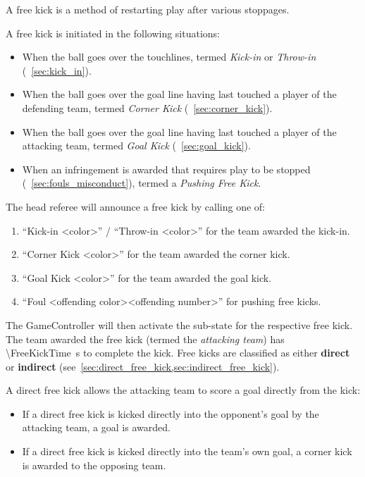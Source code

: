 A free kick is a method of restarting play after various stoppages.

A free kick is initiated in the following situations:
\begin{itemize}
  \item When the ball goes over the touchlines, termed \emph{Kick-in} or \emph{Throw-in} (\cf~\cref{sec:kick_in}).
  \item When the ball goes over the goal line having last touched a player of the defending team, termed \emph{Corner Kick} (\cf~\cref{sec:corner_kick}).
  \item When the ball goes over the goal line having last touched a player of the attacking team, termed \emph{Goal Kick} (\cf~\cref{sec:goal_kick}).
  \item When an infringement is awarded that requires play to be stopped (\cf~\cref{sec:fouls_misconduct}), termed a \emph{Pushing Free Kick}.
\end{itemize}

The head referee will announce a free kick by calling one of:
\begin{enumerate}
  \item ``Kick-in \textless color\textgreater'' / ``Throw-in \textless color\textgreater'' for the team awarded the kick-in.
  \item ``Corner Kick \textless color\textgreater'' for the team awarded the corner kick.
  \item ``Goal Kick \textless color\textgreater'' for the team awarded the goal kick.
  \item ``Foul \textless offending color\textgreater \textless offending number\textgreater'' for pushing free kicks.
\end{enumerate}

The GameController will then activate the sub-state for the respective free kick.
The team awarded the free kick (termed the \emph{attacking team}) has \qty{\FreeKickTime}{\second} to complete the kick.
Free kicks are classified as either \textbf{direct} or \textbf{indirect} (see~\cref{sec:direct_free_kick,sec:indirect_free_kick}).

\label{sec:direct_free_kick}

A direct free kick allows the attacking team to score a goal directly from the kick:
\begin{itemize}
  \item If a direct free kick is kicked directly into the opponent's goal by the attacking team, a goal is awarded.
  \item If a direct free kick is kicked directly into the team's own goal, a corner kick is awarded to the opposing team.
\end{itemize}

